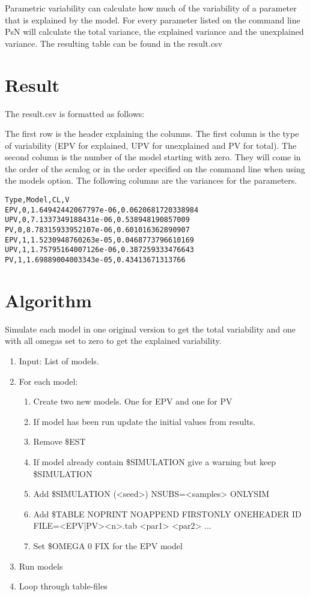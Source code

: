 Parametric variability can calculate how much of the variability of a parameter that is explained by the model. For every parameter listed on the command line PsN will calculate the total variance, the explained variance and the unexplained variance. The resulting table can be found in the result.csv

\section{Result}

The result.csv is formatted as follows:

The first row is the header explaining the columns.
The first column is the type of variability (EPV for explained, UPV for unexplained and PV for total). The second column is the number of the model starting with zero. They will come in the order of the scmlog or in the order specified on the command line when using the models option. The following columns are the variances for the parameters.

\begin{verbatim}
Type,Model,CL,V
EPV,0,1.64942442067797e-06,0.0620681720338984
UPV,0,7.1337349188431e-06,0.538948190857009
PV,0,8.78315933952107e-06,0.601016362890907
EPV,1,1.5230948760263e-05,0.0468773796610169
UPV,1,1.75795164007126e-06,0.387259333476643
PV,1,1.69889004003343e-05,0.43413671313766
\end{verbatim}

\section{Algorithm}

Simulate each model in one original version to get the total variability and one with all omegas set to zero to get the explained variability.

\begin{enumerate}
	\item Input: List of models.
	\item For each model:
	\begin{enumerate}
		\item Create two new models. One for EPV and one for PV
		\item If model has been run update the initial values from results.
		\item Remove \$EST
		\item If model already contain \$SIMULATION give a warning but keep \$SIMULATION
		\item Add \$SIMULATION (<seed>) NSUBS=<samples> ONLYSIM
		\item Add \$TABLE NOPRINT NOAPPEND FIRSTONLY ONEHEADER ID FILE=<EPV|PV><n>.tab <par1> <par2> ...
		\item Set \$OMEGA 0 FIX for the EPV model
	\end{enumerate}
	\item Run models
	\item Loop through table-files
\end{enumerate}


